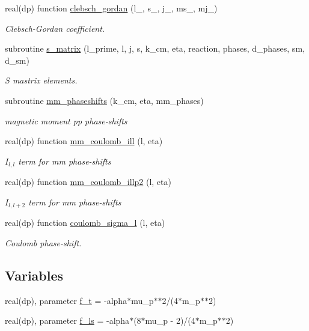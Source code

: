 \begin{DoxyCompactItemize}
real(dp) function \hyperlink{namespaceamplitudes_a6951abfeedd0051bf2e6de17ecc63192}{clebsch\+\_\+gordan} (l\+\_\+, s\+\_\+, j\+\_\+, ms\+\_\+, mj\+\_\+)
\begin{DoxyCompactList}\small\item\em Clebsch-\/\+Gordan coefficient. \end{DoxyCompactList}\item 
subroutine \hyperlink{namespaceamplitudes_aa0bb740284302f942c6c9a699e5ca02e}{s\+\_\+matrix} (l\+\_\+prime, l, j, s, k\+\_\+cm, eta, reaction, phases, d\+\_\+phases, sm, d\+\_\+sm)
\begin{DoxyCompactList}\small\item\em S mastrix elements. \end{DoxyCompactList}\item 
subroutine \hyperlink{namespaceamplitudes_a35c5cf6a646b74a95d965607bb5e9de1}{mm\+\_\+phaseshifts} (k\+\_\+cm, eta, mm\+\_\+phases)
\begin{DoxyCompactList}\small\item\em magnetic moment pp phase-\/shifts \end{DoxyCompactList}\item 
real(dp) function \hyperlink{namespaceamplitudes_abb9203b80454e518fb0b7083145bfcd8}{mm\+\_\+coulomb\+\_\+ill} (l, eta)
\begin{DoxyCompactList}\small\item\em $I_{l,l}$ term for mm phase-\/shifts \end{DoxyCompactList}\item 
real(dp) function \hyperlink{namespaceamplitudes_a36e09d619793ad91a1a65660cbf4ad7f}{mm\+\_\+coulomb\+\_\+illp2} (l, eta)
\begin{DoxyCompactList}\small\item\em $I_{l,l+2}$ term for mm phase-\/shifts \end{DoxyCompactList}\item 
real(dp) function \hyperlink{namespaceamplitudes_a6d36494ebd9aa3af10c1f7c40c80e876}{coulomb\+\_\+sigma\+\_\+l} (l, eta)
\begin{DoxyCompactList}\small\item\em Coulomb phase-\/shift. \end{DoxyCompactList}\end{DoxyCompactItemize}
\subsection*{Variables}
\begin{DoxyCompactItemize}
\item 
real(dp), parameter \hyperlink{namespaceamplitudes_a592f05bd4b5b0efc3ce15d946e8dd373}{f\+\_\+t} = -\/alpha$\ast$mu\+\_\+p$\ast$$\ast$2/(4$\ast$m\+\_\+p$\ast$$\ast$2)
\item 
real(dp), parameter \hyperlink{namespaceamplitudes_a66225c0cf7502883252939f6ab9b5b27}{f\+\_\+ls} = -\/alpha$\ast$(8$\ast$mu\+\_\+p -\/ 2)/(4$\ast$m\+\_\+p$\ast$$\ast$2)
\end{DoxyCompactItemize}



